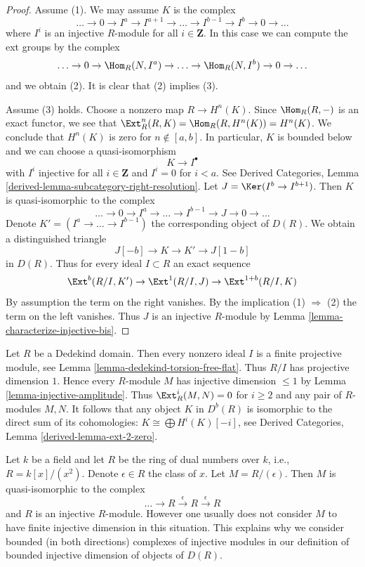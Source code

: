 \begin{proof}
Assume (1). We may assume $K$ is the complex
$$
\ldots \to 0 \to I^a \to I^{a + 1} \to \ldots \to
I^{b - 1} \to I^b \to 0 \to \ldots
$$
where $I^i$ is an injective $R$-module for all $i \in \mathbf{Z}$.
In this case we can compute the ext groups by the complex
$$
\ldots \to 0 \to \Hom_R(N, I^a) \to \ldots \to
\Hom_R(N, I^b) \to 0 \to \ldots
$$
and we obtain (2). It is clear that (2) implies (3).

\medskip\noindent
Assume (3) holds. Choose a nonzero map $R \to H^n(K)$. Since $\Hom_R(R, -)$
is an exact functor, we see that
$\Ext^n_R(R, K) = \Hom_R(R, H^n(K)) = H^n(K)$.
We conclude that $H^n(K)$ is zero for $n \not \in [a, b]$.
In particular, $K$ is bounded below and we can choose a quasi-isomorphism
$$
K \to I^\bullet
$$
with $I^i$ injective for all $i \in \mathbf{Z}$ and
$I^i = 0$ for $i < a$. See Derived Categories, Lemma
\ref{derived-lemma-subcategory-right-resolution}.
Let $J = \Ker(I^b \to I^{b + 1})$. Then $K$ is quasi-isomorphic
to the complex
$$
\ldots \to 0 \to I^a \to \ldots \to I^{b - 1} \to J \to 0 \to \ldots
$$
Denote $K' = (I^a \to \ldots \to I^{b - 1})$ the corresponding object of
$D(R)$. We obtain a distinguished triangle
$$
J[-b] \to K \to K' \to J[1 - b]
$$
in $D(R)$. Thus for every ideal $I \subset R$ an exact sequence
$$
\Ext^b(R/I, K') \to \Ext^1(R/I, J) \to \Ext^{1 + b}(R/I, K)
$$
By assumption the term on the right vanishes. By the implication
(1) $\Rightarrow$ (2) the term on the left vanishes. Thus $J$
is an injective $R$-module by
Lemma \ref{lemma-characterize-injective-bis}.
\end{proof}

\begin{example}
\label{example-finite-injective-finite-global-dimension}
Let $R$ be a Dedekind domain. Then every nonzero ideal $I$ is
a finite projective module, see Lemma \ref{lemma-dedekind-torsion-free-flat}.
Thus $R/I$ has projective dimension $1$. Hence every $R$-module $M$
has injective dimension $\leq 1$ by Lemma \ref{lemma-injective-amplitude}.
Thus $\Ext^i_R(M, N) = 0$ for $i \geq 2$ and any pair of $R$-modules $M, N$.
It follows that any object $K$ in $D^b(R)$ is isomorphic to the direct sum
of its cohomologies: $K \cong \bigoplus H^i(K)[-i]$, see
Derived Categories, Lemma \ref{derived-lemma-ext-2-zero}.
\end{example}

\begin{example}
\label{example-ext-not-bounded-reversed}
Let $k$ be a field and let $R$ be the ring of dual numbers
over $k$, i.e., $R = k[x]/(x^2)$. Denote $\epsilon \in R$ the
class of $x$. Let $M = R/(\epsilon)$. Then $M$ is quasi-isomorphic
to the complex
$$
\ldots \to R \xrightarrow{\epsilon} R \xrightarrow{\epsilon} R
$$
and $R$ is an injective $R$-module. However one usually does not
consider $M$ to have finite injective dimension in this situation.
This explains why we consider bounded (in both directions) complexes
of injective modules in our definition of bounded injective dimension
of objects of $D(R)$.
\end{example}

